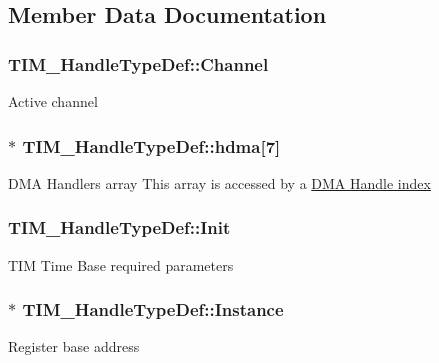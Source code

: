 \subsection{Member Data Documentation}
\subsubsection[{\texorpdfstring{Channel}{Channel}}]{ T\+I\+M\+\_\+\+Handle\+Type\+Def\+::\+Channel}\hypertarget{struct_t_i_m___handle_type_def_ae9c5a11c1f5b27c808c0aca453e63870}{}\label{struct_t_i_m___handle_type_def_ae9c5a11c1f5b27c808c0aca453e63870}
Active channel 
\subsubsection[{\texorpdfstring{hdma}{hdma}}]{$\ast$ T\+I\+M\+\_\+\+Handle\+Type\+Def\+::hdma\mbox{[}7\mbox{]}}\hypertarget{struct_t_i_m___handle_type_def_a15338c71de82fa178c685be868e694bd}{}\label{struct_t_i_m___handle_type_def_a15338c71de82fa178c685be868e694bd}
D\+MA Handlers array This array is accessed by a \hyperlink{group___d_m_a___handle__index}{D\+MA Handle index} 
\subsubsection[{\texorpdfstring{Init}{Init}}]{ T\+I\+M\+\_\+\+Handle\+Type\+Def\+::\+Init}\hypertarget{struct_t_i_m___handle_type_def_a8b2e61c3c4128e62cb7be7d35048152e}{}\label{struct_t_i_m___handle_type_def_a8b2e61c3c4128e62cb7be7d35048152e}
T\+IM Time Base required parameters 
\subsubsection[{\texorpdfstring{Instance}{Instance}}]{$\ast$ T\+I\+M\+\_\+\+Handle\+Type\+Def\+::\+Instance}\hypertarget{struct_t_i_m___handle_type_def_ad0c5f736a15f6d8d14724854c8133bcc}{}\label{struct_t_i_m___handle_type_def_ad0c5f736a15f6d8d14724854c8133bcc}
Register base address 

